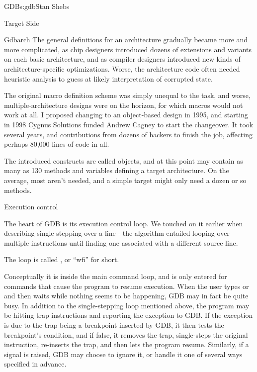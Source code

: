 \begin{aosachapter}{GDB}{s:gdb}{Stan Shebs}
\begin{aosasect1}{Target Side}
\begin{aosasect2}{Gdbarch}
The general definitions for an architecture gradually became more and
more complicated, as chip designers introduced dozens of extensions
and variants on each basic architecture, and as compiler designers
introduced new kinds of architecture-specific optimizations.  Worse,
the architecture code often needed heuristic analysis to guess at
likely interpretation of corrupted state.

The original macro definition scheme was simply unequal to the task,
and worse, multiple-architecture designs were on the horizon, for
which macros would not work at all.  I proposed changing to an
object-based design in 1995, and starting in 1998 Cygnus Solutions
funded Andrew Cagney to start the changeover.  It took several years,
and contributions from dozens of hackers to finish the job, affecting
perhaps 80,000 lines of code in all.

The introduced constructs are called  objects, and at
this point may contain as many as 130 methods and variables defining
a target architecture.  On the average, most aren't needed, and a
simple target might only need a dozen or so methods.


\end{aosasect2}

\begin{aosasect2}{Execution control}

The heart of GDB is its execution control loop.  We touched on it
earlier when describing single-stepping over a line - the algorithm
entailed looping over multiple instructions until finding one
associated with a different source line.

The loop is called , or ``wfi'' for short.

Conceptually it is inside the main command loop, and is only entered
for commands that cause the program to resume execution.  When the
user types  or  and then waits while nothing
seems to be happening, GDB may in fact be quite busy.  In addition to
the single-stepping loop mentioned above, the program may be hitting
trap instructions and reporting the exception to GDB.  If the
exception is due to the trap being a breakpoint inserted by GDB, it
then tests the breakpoint's condition, and if false, it removes the
trap, single-steps the original instruction, re-inserts the trap, and
then lets the program resume.  Similarly, if a signal is raised, GDB
may choose to ignore it, or handle it one of several ways specified in
advance.


\end{aosasect2}
\end{aosasect1}
\end{aosachapter}
